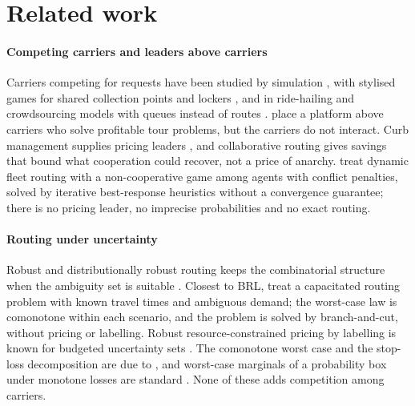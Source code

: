 \documentclass[preprint,11pt]{elsarticle}
\theoremstyle{definition}
\theoremstyle{remark}
\begin{document}
\section{Related work}\label{sec:related}

\paragraph{Competing carriers and leaders above carriers} Carriers competing for requests have been studied by simulation \citep{Figliozzi2004}, with stylised games for shared collection points and lockers \citep{Li2024}, and in ride-hailing and crowdsourcing models with queues instead of routes \citep{Taylor2018,Benjaafar2022}. \citet{Cerulli2024} place a platform above carriers who solve profitable tour problems, but the carriers do not interact. Curb management supplies pricing leaders \citep{XuSun2024}, and collaborative routing \citep{GanstererHartl2018} gives savings that bound what cooperation could recover, not a price of anarchy. \citet{LiuMaMa2026} treat dynamic fleet routing with a non-cooperative game among agents with conflict penalties, solved by iterative best-response heuristics without a convergence guarantee; there is no pricing leader, no imprecise probabilities and no exact routing.

\paragraph{Routing under uncertainty} Robust and distributionally robust routing keeps the combinatorial structure when the ambiguity set is suitable \citep{Gounaris2013,GhosalWiesemann2020}. Closest to BRL, \citet{GhosalHoWiesemann2024} treat a capacitated routing problem with known travel times and ambiguous demand; the worst-case law is comonotone within each scenario, and the problem is solved by branch-and-cut, without pricing or labelling. Robust resource-constrained pricing by labelling is known for budgeted uncertainty sets \citep{Pessoa2015}. The comonotone worst case and the stop-loss decomposition are due to \citet{Meilijson1979} \citep[see also][]{Tchen1980}, and worst-case marginals of a probability box under monotone losses are standard \citep{Williamson1990}. None of these adds competition among carriers.
\end{document}
